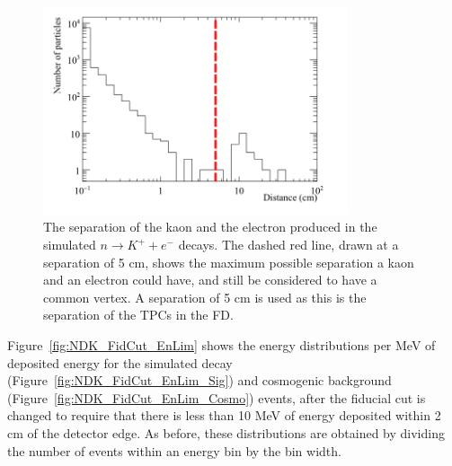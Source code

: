 \begin{figure}
  \centering
  \includegraphics[width=0.8\textwidth]{NucleonDecay_KaonElecSep}
  \caption[The separation of the kaon and the electron produced in the simulated $n \rightarrow K^{+} + e^{-}$ decays]
          {The separation of the kaon and the electron produced in the simulated $n \rightarrow K^{+} + e^{-}$ decays. The dashed red line, drawn at a separation of 5 cm, shows the maximum possible separation a kaon and an electron could have, and still be considered to have a common vertex. A separation of 5 cm is used as this is the separation of the TPCs in the FD.}
  \label{fig:NDK_Sig_KEDist}
\end{figure}

Figure~\ref{fig:NDK_FidCut_EnLim} shows the energy distributions per MeV of deposited energy for the simulated decay (Figure~\ref{fig:NDK_FidCut_EnLim_Sig}) and cosmogenic background (Figure~\ref{fig:NDK_FidCut_EnLim_Cosmo}) events, after the fiducial cut is changed to require that there is less than 10 MeV of energy deposited within 2 cm of the detector edge. As before, these distributions are obtained by dividing the number of events within an energy bin by the bin width. \\


